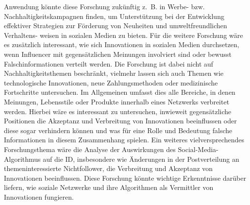 \documentclass[runningheads]{llncs}
\begin{document}
Anwendung könnte diese Forschung zukünftig z. B. in Werbe- bzw. Nachhaltigkeitskampagnen finden, um Unterstützung bei der Entwicklung effektiver Strategien zur Förderung von Neuheiten und umweltfreundlichen Verhaltens- weisen in sozialen Medien zu bieten. 
Für die weitere Forschung wäre es zusätzlich interessant, wie sich Innovationen in sozialen Medien durchsetzen, wenn Influencer mit gegensätzlichen Meinungen involviert sind oder bewusst Falschinformationen verteilt werden. 
Die Forschung ist dabei nicht auf Nachhaltigkeitsthemen beschränkt, vielmehr lassen sich auch Themen wie technologische Innovationen, neue Zahlungsmethoden oder medizinische Fortschritte untersuchen. Im Allgemeinen umfasst dies alle Bereiche, in denen Meinungen, Lebensstile oder Produkte innerhalb eines Netzwerks verbreitet werden.
Hierbei wäre es interessant zu untersuchen, inwieweit gegensätzliche Positionen die Akzeptanz und Verbreitung von Innovationen beeinflussen oder diese sogar verhindern können und was für eine Rolle und Bedeutung falsche Informationen in diesem Zusammenhang spielen.
Ein weiteres vielversprechendes Forschungsthema wäre die Analyse der Auswirkungen des Social-Media-Algorithmus auf die ID, insbesondere wie Änderungen in der Postverteilung an themeninteressierte Nichtfollower, die Verbreitung und Akzeptanz von Innovationen beeinflussen. Diese Forschung könnte wichtige Erkenntnisse darüber liefern, wie soziale Netzwerke und ihre Algorithmen als Vermittler von Innovationen fungieren.


%
%
%

%
   
  
\end{document}
